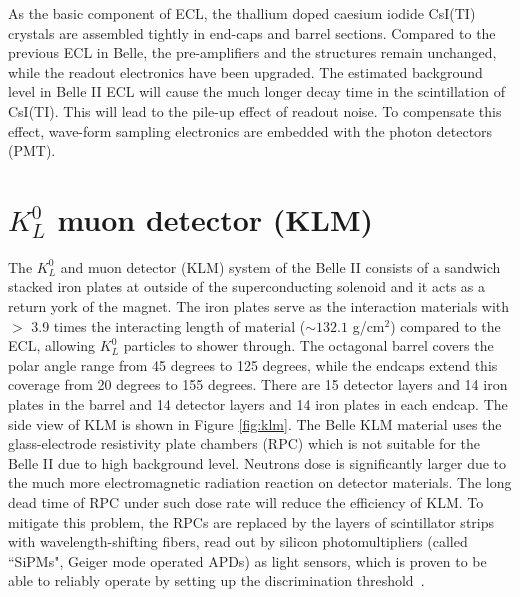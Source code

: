 As the basic component of ECL, the  thallium doped caesium iodide CsI(TI) crystals are assembled tightly in end-caps and barrel sections. Compared to the previous ECL in Belle, the pre-amplifiers and the structures remain unchanged, while the readout  electronics have been upgraded. The estimated background level in Belle II ECL will cause the much longer decay time in the scintillation of CsI(TI). This will lead to the pile-up effect of readout noise. To compensate this effect, wave-form sampling electronics are embedded with the photon detectors (PMT).
 
\begin{comment}
Especially in the forward direction of the electron beamline, where the level of beam background is much higher, the effect of pile-up noise becomes even worse and the performance of ECL will be of trouble if no special measure taken. Therefore, the pure CsI crystal is considered to be chosen as the material of detector to achieve a fast wave-shaping time and higher radiation tolerance compared to the dosed CsI(TI), which is an back-up option for the future upgrade. ECL is the most important detector for providing trigger information for low multiplicity events, since the main feature of these events is one or two energetic photon(s) emitted from IP region while the charged tracks are missing. 
\end{comment}
  

\section{$K_L^0$ muon detector (KLM)}
The $K_L^0$ and muon detector (KLM) system of the Belle II consists of a sandwich stacked iron plates at outside of the superconducting solenoid and it acts as a return york of the magnet. The iron plates serve as the interaction materials with $>$ 3.9 times the interacting length of material ($\sim 132.1$ g/cm$^{2}$) compared to the ECL, allowing $K_L^0$ particles to shower through. The octagonal barrel covers the polar angle range from 45 degrees to 125 degrees, while the endcaps extend
this coverage from 20 degrees to 155 degrees. There are 15 detector layers and 14 iron plates in the barrel and
14 detector layers and 14 iron plates in each endcap. The side view of KLM is shown in Figure \ref{fig:klm}.
The Belle KLM material uses the glass-electrode resistivity plate chambers (RPC) which is not suitable for the Belle II due to high background level.  Neutrons dose is significantly larger due to the much more electromagnetic radiation reaction on detector materials. The long dead time of RPC under such dose rate will reduce the efficiency of KLM. To mitigate this problem, the RPCs are replaced by the layers of scintillator strips with wavelength-shifting ﬁbers, read out by silicon photomultipliers (called ``SiPMs", Geiger mode operated APDs) as light sensors, which is proven to be able to reliably operate by setting up the discrimination threshold~\cite{b2book}.

